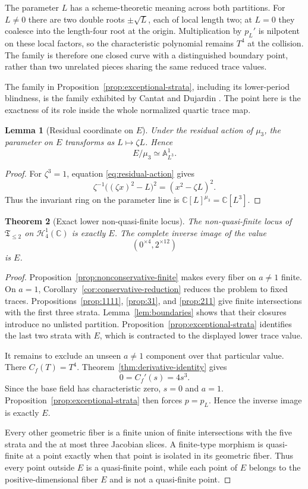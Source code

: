 \documentclass[11pt]{article}
\newtheorem{theorem}{Theorem}[section]
\newtheorem{lemma}[theorem]{Lemma}
\theoremstyle{definition}
\newcommand{\C}{\mathbb C}
\newcommand{\A}{\mathbb A}
\newcommand{\Hn}{\mathcal H}
\begin{document}
The parameter $L$ has a scheme-theoretic meaning across both partitions. For $L\ne0$ there are two double roots $\pm\sqrt L$, each of local length two; at $L=0$ they coalesce into the length-four root at the origin. Multiplication by $p_L'$ is nilpotent on these local factors, so the characteristic polynomial remains $T^4$ at the collision. The family is therefore one closed curve with a distinguished boundary point, rather than two unrelated pieces sharing the same reduced trace values.

The family in Proposition~\ref{prop:exceptional-strata}, including its lower-period blindness, is the family exhibited by Cantat and Dujardin \cite{CantatDujardin2026}. The point here is the exactness of its role inside the whole normalized quartic trace map.

\begin{lemma}[Residual coordinate on $E$]
\label{lem:E-quotient}
Under the residual action of $\mu_3$, the parameter on $E$ transforms as $L\mapsto\zeta L$. Hence
\[
E/\mu_3\simeq\A^1_{L^3}.
\]
\end{lemma}

\begin{proof}
For $\zeta^3=1$, equation \eqref{eq:residual-action} gives
\[
\zeta^{-1}\bigl((\zeta x)^2-L\bigr)^2
=
(x^2-\zeta L)^2.
\]
Thus the invariant ring on the parameter line is $\C[L]^{\mu_3}=\C[L^3]$.
\end{proof}

\begin{theorem}[Exact lower non-quasi-finite locus]
\label{thm:lower-locus}
The non-quasi-finite locus of $\mathfrak T_{\le2}$ on $\Hn^1_4(\C)$ is exactly $E$. The complete inverse image of the value
\[
(0^{\times4},2^{\times12})
\]
is $E$.
\end{theorem}

\begin{proof}
Proposition~\ref{prop:nonconservative-finite} makes every fiber on $a\ne1$ finite. On $a=1$, Corollary~\ref{cor:conservative-reduction} reduces the problem to fixed traces. Propositions~\ref{prop:1111}, \ref{prop:31}, and \ref{prop:211} give finite intersections with the first three strata. Lemma~\ref{lem:boundaries} shows that their closures introduce no unlisted partition. Proposition~\ref{prop:exceptional-strata} identifies the last two strata with $E$, which is contracted to the displayed lower trace value.

It remains to exclude an unseen $a\ne1$ component over that particular value. There $C_f(T)=T^4$. Theorem~\ref{thm:derivative-identity} gives
\[
0=C_f'(s)=4s^3.
\]
Since the base field has characteristic zero, $s=0$ and $a=1$. Proposition~\ref{prop:exceptional-strata} then forces $p=p_L$. Hence the inverse image is exactly $E$.

Every other geometric fiber is a finite union of finite intersections with the five strata and the at most three Jacobian slices. A finite-type morphism is quasi-finite at a point exactly when that point is isolated in its geometric fiber. Thus every point outside $E$ is a quasi-finite point, while each point of $E$ belongs to the positive-dimensional fiber $E$ and is not a quasi-finite point.
\end{proof}
\end{document}
